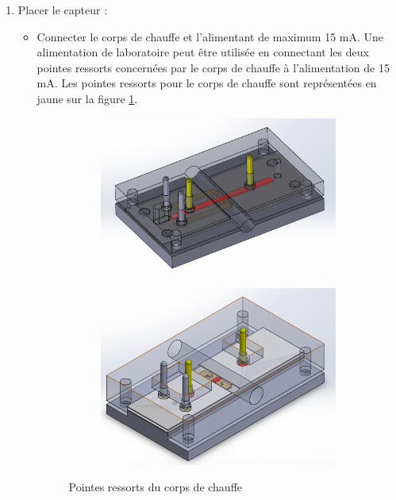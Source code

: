 \begin{enumerate}
    \item Placer le capteur :
          \begin{itemize}
              \item Connecter le corps de chauffe et l'alimentant de maximum 15 mA. Une alimentation de laboratoire peut être utilisée en connectant
                    les deux pointes ressorts concernées par le corps de chauffe à l'alimentation de 15 mA. Les pointes ressorts pour le corps de chauffe
                    sont représentées en jaune sur la figure \ref*{fig:pointes_ressorts_chauffe}.
                    \begin{figure}[H]
                        \centering
                        \begin{subfigure}[b]{0.45\textwidth}
                            \includegraphics[scale = 0.3]{assets/figures/pointes_ressorts_chauffe.png}
                        \end{subfigure}
                        \begin{subfigure}{0.45\textwidth}
                            \includegraphics[scale = 0.3]{assets/figures/pointes_ressorts_chauffe_design5.png}
                        \end{subfigure}
                        \caption{Pointes ressorts du corps de chauffe}
                        \label{fig:pointes_ressorts_chauffe}
                    \end{figure}
          \end{itemize}
          

\end{enumerate}
